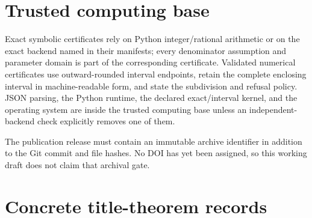 \documentclass[11pt]{article}
\begin{document}
\section{Trusted computing base}

Exact symbolic certificates rely on Python integer/rational arithmetic or on
the exact backend named in their manifests; every denominator assumption and
parameter domain is part of the corresponding certificate.  Validated
numerical certificates use outward-rounded interval endpoints, retain the
complete enclosing interval in machine-readable form, and state the
subdivision and refusal policy.  JSON parsing, the Python runtime, the
declared exact/interval kernel, and the operating system are inside the
trusted computing base unless an independent-backend check explicitly
removes one of them.

The publication release must contain an immutable archive identifier in
addition to the Git commit and file hashes.  No DOI has yet been assigned, so
this working draft does not claim that archival gate.

\section{Concrete title-theorem records}
\end{document}

